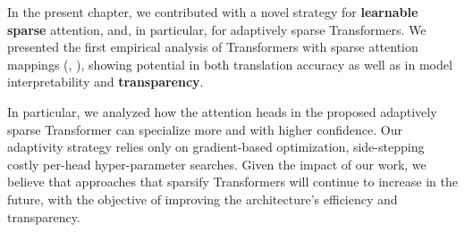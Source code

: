 In the present chapter, we contributed with a novel strategy for
\textbf{learnable sparse} attention, and, in particular, for adaptively
sparse Transformers. We presented the first empirical analysis of
Transformers with sparse attention mappings (\ie, \entmaxtext),
showing potential in both translation accuracy as well as in model
interpretability and \textbf{transparency}.

In particular, we analyzed how the attention heads in the proposed
adaptively sparse Transformer can specialize more and with higher
confidence. Our adaptivity strategy relies only on gradient-based
optimization, side-stepping costly per-head hyper-parameter searches.
Given the impact of our work, we believe that approaches that
sparsify Transformers will continue to increase in the future, with
the objective of improving the architecture's efficiency and
transparency.

\cleardoublepage

\singlespacing